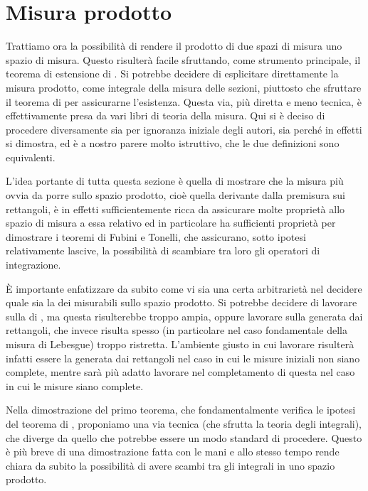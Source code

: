 \section{Misura prodotto}
Trattiamo ora la possibilità di rendere il prodotto di due spazi di misura uno spazio di misura. 
Questo risulterà facile sfruttando, come strumento principale, il teorema di estensione di \carat{}. 
Si potrebbe decidere di esplicitare direttamente la misura prodotto, come integrale della misura delle sezioni, piuttosto che sfruttare il teorema di \carat{} per assicurarne l'esistenza. 
Questa via, più diretta e meno tecnica, è effettivamente presa da vari libri di teoria della misura. Qui si è deciso di procedere diversamente sia per ignoranza iniziale degli autori, sia perché in effetti si dimostra, ed è a nostro parere molto istruttivo, che le due definizioni sono equivalenti.

L'idea portante di tutta questa sezione è quella di mostrare che la misura più ovvia da porre sullo spazio prodotto, cioè quella derivante dalla premisura sui rettangoli, è in effetti sufficientemente  ricca da assicurare molte proprietà allo spazio di misura a essa relativo ed in particolare ha sufficienti proprietà per dimostrare i teoremi di Fubini e Tonelli, che assicurano, sotto ipotesi relativamente lascive, la possibilità di scambiare tra loro gli operatori di integrazione.

È importante enfatizzare da subito come vi sia una certa arbitrarietà nel decidere quale sia la \sigalg{} dei misurabili sullo spazio prodotto. Si potrebbe decidere di lavorare sulla \sigalg{} di \carat{}, ma questa risulterebbe troppo ampia, oppure lavorare sulla \sigalg{} generata dai rettangoli, che invece risulta spesso (in particolare nel caso fondamentale della misura di Lebesgue) troppo ristretta.
L'ambiente giusto in cui lavorare risulterà infatti essere la \sigalg{} generata dai rettangoli nel caso in cui le misure iniziali non siano complete, mentre sarà più adatto lavorare nel completamento di questa \sigalg{} nel caso in cui le misure siano complete.



Nella dimostrazione del primo teorema, che fondamentalmente verifica le ipotesi del teorema di \carat{}, proponiamo una via tecnica (che sfrutta la teoria degli integrali), che diverge da quello che potrebbe essere un modo standard di procedere. Questo è più breve di una dimostrazione fatta con le mani e allo stesso tempo rende chiara da subito la possibilità di avere scambi tra gli integrali in uno spazio prodotto. 

